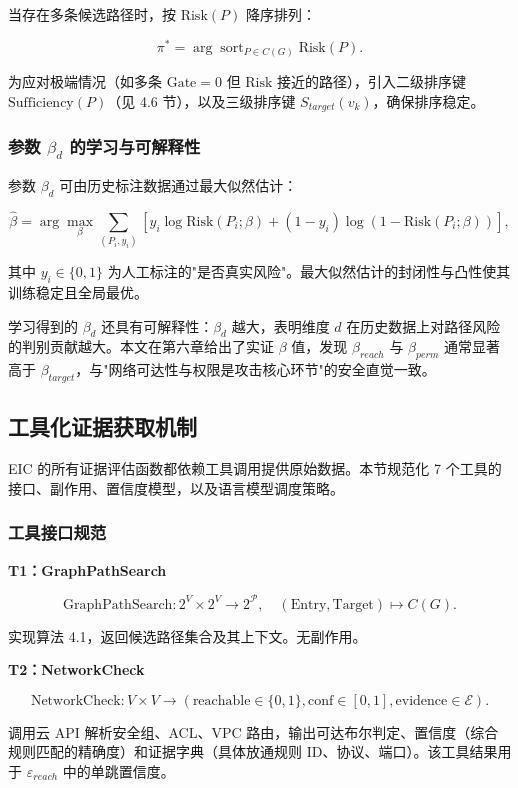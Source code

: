 \documentclass[a4paper,12pt]{ctexart}
\begin{document}
当存在多条候选路径时，按 $\text{Risk}(P)$ 降序排列：

\[
\pi^* = \arg\!\operatorname{sort}_{P \in C(G)} \text{Risk}(P).
\]

为应对极端情况（如多条 $\text{Gate}=0$ 但 $\text{Risk}$ 接近的路径），引入二级排序键 $\text{Sufficiency}(P)$（见 4.6 节），以及三级排序键 $S_{target}(v_k)$，确保排序稳定。

\subsubsection{参数 $\beta_d$ 的学习与可解释性}

参数 $\beta_d$ 可由历史标注数据通过最大似然估计：

\[
\hat{\beta} = \arg\max_{\beta} \sum_{(P_i, y_i)} \left[ y_i \log \text{Risk}(P_i; \beta) + (1-y_i) \log (1 - \text{Risk}(P_i; \beta)) \right],
\]

其中 $y_i \in \{0,1\}$ 为人工标注的"是否真实风险"。最大似然估计的封闭性与凸性使其训练稳定且全局最优。

学习得到的 $\beta_d$ 还具有可解释性：$\beta_d$ 越大，表明维度 $d$ 在历史数据上对路径风险的判别贡献越大。本文在第六章给出了实证 $\beta$ 值，发现 $\beta_{reach}$ 与 $\beta_{perm}$ 通常显著高于 $\beta_{target}$，与"网络可达性与权限是攻击核心环节"的安全直觉一致。

\subsection{工具化证据获取机制}

EIC 的所有证据评估函数都依赖工具调用提供原始数据。本节规范化 7 个工具的接口、副作用、置信度模型，以及语言模型调度策略。

\subsubsection{工具接口规范}

\textbf{T1：GraphPathSearch}

\[
\text{GraphPathSearch}: 2^V \times 2^V \to 2^{\mathcal{P}}, \quad (\text{Entry}, \text{Target}) \mapsto C(G).
\]

实现算法 4.1，返回候选路径集合及其上下文。无副作用。

\textbf{T2：NetworkCheck}

\[
\text{NetworkCheck}: V \times V \to (\text{reachable} \in \{0,1\}, \text{conf} \in [0,1], \text{evidence} \in \mathcal{E}).
\]

调用云 API 解析安全组、ACL、VPC 路由，输出可达布尔判定、置信度（综合规则匹配的精确度）和证据字典（具体放通规则 ID、协议、端口）。该工具结果用于 $\varepsilon_{reach}$ 中的单跳置信度。
\end{document}

